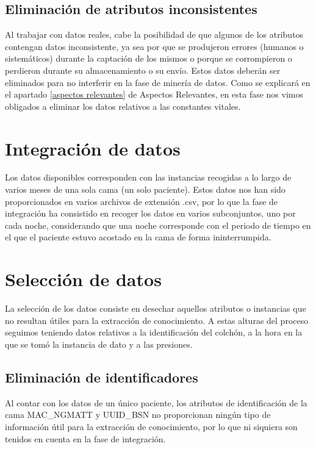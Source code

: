 \subsection{Eliminación de atributos inconsistentes}

Al trabajar con datos reales, cabe la posibilidad de que algunos de los atributos contengan datos inconsistente, ya sea por que se produjeron errores (humanos o sistemáticos) durante la captación de los mismos o porque se corrompieron o perdieron durante su almacenamiento o su envío. Estos datos deberán ser eliminados para no interferir en la fase de minería de datos. Como se explicará en el apartado \ref{aspectos relevantes} de Aspectos Relevantes, en esta fase nos vimos obligados a eliminar los datos relativos a las constantes vitales. 

\section{Integración de datos}

Los datos disponibles corresponden con las instancias recogidas a lo largo de varios meses de una sola cama (un solo paciente). Estos datos nos han sido proporcionados en varios archivos de extensión .csv, por lo que la fase de integración ha consistido en recoger los datos en varios subconjuntos, uno por cada noche, considerando que una noche corresponde con el periodo de tiempo en el que el paciente estuvo acostado en la cama de forma ininterrumpida. 

\section{Selección de datos}

La selección de los datos consiste en desechar aquellos atributos o instancias que no resultan útiles para la extracción de conocimiento. A estas alturas del proceso seguimos teniendo datos relativos a la identificación del colchón, a la hora en la que se tomó la instancia de dato y a las presiones. 

\subsection{Eliminación de identificadores}

Al contar con los datos de un único paciente, los atributos de identificación de la cama MAC\_NGMATT y UUID\_BSN no proporcionan ningún tipo de información útil para la extracción de conocimiento, por lo que ni siquiera son tenidos en cuenta en la fase de integración. 

